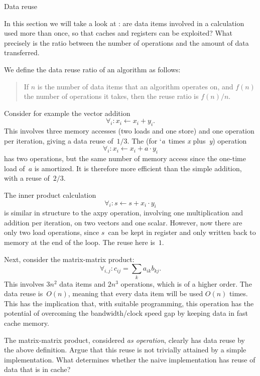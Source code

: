  {Data reuse}
\label{sec:reuse}
\label{sec:gemm}

In this section we will take a look at : are
data items involved in a calculation used more than once, so that
caches and registers can be exploited? What precisely is the ratio
between the number of operations and the amount of data transferred.

We define the data reuse ratio of an algorithm as follows:
\begin{quote}
  If $n$ is the number of data items that an algorithm operates on, and
  $f(n)$ the number of operations it takes, then the reuse ratio is
  $f(n)/n$.
\end{quote}

Consider for example the vector addition 
\[ \forall_i\colon x_i\leftarrow x_i+y_i.
\]
This involves three memory accesses (two loads and one store) 
and one operation per iteration,
giving a data reuse of~$1/3$. The  (for
`\emph{a}~times \emph{x} plus~\emph{y}) operation 
\[ \forall_i\colon x_i\leftarrow x_i+a\cdot y_i
\]
has
two operations, but the same number of memory access since the
one-time load of~$a$ is amortized. It is therefore more efficient
than the simple addition, with a reuse of~$2/3$.

The inner product calculation 
\[ \forall_i\colon s\leftarrow s+x_i\cdot y_i
\]
is similar in structure to the axpy operation, involving one
multiplication and addition per iteration, on two vectors and one
scalar. However, now there are only two load operations, since $s$~can
be kept in register and only written back to memory at the end of the
loop. The reuse here is~$1$.


Next, consider the matrix-matrix product:
\[ \forall_{i,j}\colon c_{ij} = \sum_k a_{ik}b_{kj}. \] This involves
$3n^2$ data items and $2n^3$ operations, which is of a
higher order. The data reuse is~$O(n)$, meaning that every data item
will be used $O(n)$ times.  This has the implication that, with
suitable programming, this operation has the potential of overcoming
the bandwidth/clock speed gap by keeping data in fast cache memory.

\begin{exercise}
  The matrix-matrix product, considered \emph{as operation}, clearly
  has data reuse by the above definition. Argue that this reuse is not
  trivially attained by a simple implementation. What determines
  whether the naive implementation has  reuse of data that is in cache?
\end{exercise}

